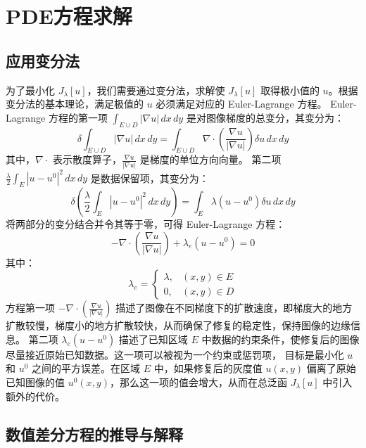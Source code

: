 \documentclass[UTF8]{ctexart}
\begin{document}
\section{PDE方程求解}
\subsection{应用变分法}
为了最小化 \( J_\lambda[u] \)，我们需要通过变分法，求解使 $J_\lambda[u]$ 取得极小值的 $u$。根据变分法的基本理论，满足极值的 $u$ 必须满足对应的 Euler-Lagrange 方程。
Euler-Lagrange 方程的第一项 $\int_{E \cup D} |\nabla u| \, dx \, dy$ 是对图像梯度的总变分，其变分为：
\[
\delta \int_{E \cup D} |\nabla u| \, dx \, dy = \int_{E \cup D} \nabla \cdot \left( \frac{\nabla u}{|\nabla u|} \right) \delta u \, dx \, dy
\]
其中，$\nabla \cdot$ 表示散度算子，$\frac{\nabla u}{|\nabla u|}$ 是梯度的单位方向向量。
第二项 $\frac{\lambda}{2} \int_{E} |u - u^0|^2 \, dx \, dy$ 是数据保留项，其变分为：
\[
\delta \left( \frac{\lambda}{2} \int_{E} |u - u^0|^2 \, dx \, dy \right) = \int_{E} \lambda (u - u^0) \delta u \, dx \, dy
\]
将两部分的变分结合并令其等于零，可得 Euler-Lagrange 方程：
\[
-\nabla \cdot \left( \frac{\nabla u}{|\nabla u|} \right) + \lambda_e (u - u^0) = 0
\]
其中：
\[
\lambda_e =
\begin{cases}
\lambda, & (x, y) \in E \\
0, & (x, y) \in D
\end{cases}
\]
方程第一项 $-\nabla \cdot \left( \frac{\nabla u}{|\nabla u|} \right)$ 描述了图像在不同梯度下的扩散速度，即梯度大的地方扩散较慢，梯度小的地方扩散较快，从而确保了修复的稳定性，保持图像的边缘信息。
第二项 $\lambda_e (u - u^0)$ 描述了已知区域 $E$ 中数据的约束条件，使修复后的图像尽量接近原始已知数据。这一项可以被视为一个约束或惩罚项，
目标是最小化 $u$ 和 $u^0$ 之间的平方误差。在区域 $E$ 中，如果修复后的灰度值 $u(x, y)$ 偏离了原始已知图像的值 $u^0(x, y)$，那么这一项的值会增大，从而在总泛函 $J_\lambda[u]$ 中引入额外的代价。


\subsection{数值差分方程的推导与解释}
\end{document}
